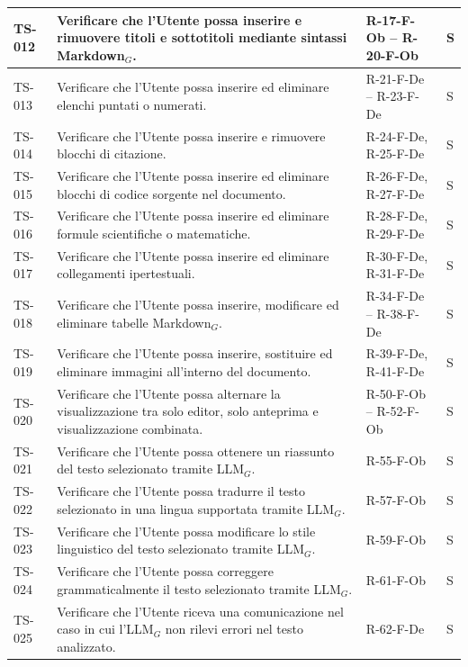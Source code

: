 \documentclass[a4paper, 10pt, colorlinks=true, linkcolor=black, urlcolor=blue, citecolor=blue, hidelinks]{article}
\begin{document}
\begin{longtable}{|p{1.4cm}|p{7.8cm}|p{2.3cm}|p{1.2cm}|}
    \hline
    TS-012 & Verificare che l'Utente possa inserire e rimuovere titoli e sottotitoli mediante sintassi Markdown$_G$. & R-17-F-Ob -- R-20-F-Ob & S \\
    \hline
    TS-013 & Verificare che l'Utente possa inserire ed eliminare elenchi puntati o numerati. & R-21-F-De -- R-23-F-De & S \\
    \hline
    TS-014 & Verificare che l'Utente possa inserire e rimuovere blocchi di citazione. & R-24-F-De, R-25-F-De & S \\
    \hline
    TS-015 & Verificare che l'Utente possa inserire ed eliminare blocchi di codice sorgente nel documento. & R-26-F-De, R-27-F-De & S \\
    \hline
    TS-016 & Verificare che l'Utente possa inserire ed eliminare formule scientifiche o matematiche. & R-28-F-De, R-29-F-De & S \\
    \hline
    TS-017 & Verificare che l'Utente possa inserire ed eliminare collegamenti ipertestuali. & R-30-F-De, R-31-F-De & S \\
    \hline
    TS-018 & Verificare che l'Utente possa inserire, modificare ed eliminare tabelle Markdown$_G$. & R-34-F-De -- R-38-F-De & S \\
    \hline
    TS-019 & Verificare che l'Utente possa inserire, sostituire ed eliminare immagini all'interno del documento. & R-39-F-De, R-41-F-De & S \\
    \hline
    TS-020 & Verificare che l'Utente possa alternare la visualizzazione tra solo editor, solo anteprima e visualizzazione combinata. & R-50-F-Ob -- R-52-F-Ob & S \\
    \hline
    TS-021 & Verificare che l'Utente possa ottenere un riassunto del testo selezionato tramite LLM$_G$. & R-55-F-Ob & S \\
    \hline
    TS-022 & Verificare che l'Utente possa tradurre il testo selezionato in una lingua supportata tramite LLM$_G$. & R-57-F-Ob & S \\
    \hline
    TS-023 & Verificare che l'Utente possa modificare lo stile linguistico del testo selezionato tramite LLM$_G$. & R-59-F-Ob & S \\
    \hline
    TS-024 & Verificare che l'Utente possa correggere grammaticalmente il testo selezionato tramite LLM$_G$. & R-61-F-Ob & S \\
    \hline
    TS-025 & Verificare che l'Utente riceva una comunicazione nel caso in cui l'LLM$_G$ non rilevi errori nel testo analizzato. & R-62-F-De & S \\
    \hline

\end{longtable}
\end{document}
